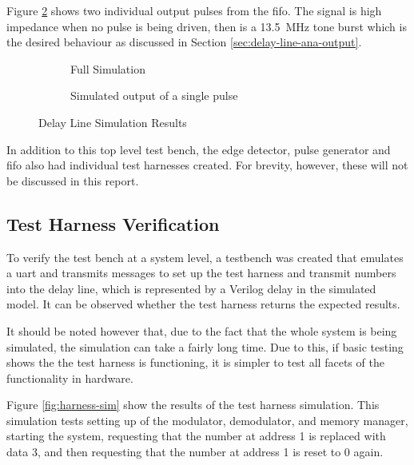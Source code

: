  Figure \ref{fig:delay-sim-single} shows two individual output pulses from the \gls{fifo}. The signal is high impedance when no pulse is being driven, then is a \SI{13.5}{\mega\hertz} tone burst which is the desired behaviour as discussed in Section \ref{sec:delay-line-ana-output}.
 
 \begin{figure}[ht]
 	\centering
 	
 	\begin{subfigure}[b]{\textwidth}
 		\centering
 		\caption{Full Simulation}
 		\label{fig:delay-sim-full}
 	\end{subfigure}
 	
 	\begin{subfigure}[b]{\textwidth}
 		\centering
 		\caption{Simulated output of a single pulse}
 		\label{fig:delay-sim-single}
 	\end{subfigure}
 	
 	\caption{Delay Line Simulation Results}
 	\label{fig:delay-sim}
 \end{figure}

In addition to this top level test bench, the edge detector, pulse generator and \gls{fifo} also had individual test harnesses created. For brevity, however, these will not be discussed in this report.

\subsection{Test Harness Verification}
To verify the test bench at a system level, a testbench was created that emulates a \gls{uart} and transmits messages to set up the test harness and transmit numbers into the delay line, which is represented by a Verilog delay in the simulated model. It can be observed whether the test harness returns the expected results.

It should be noted however that, due to the fact that the whole system is being simulated, the simulation can take a fairly long time. Due to this, if basic testing shows the the test harness is functioning, it is simpler to test all facets of the functionality in hardware.

Figure \ref{fig:harness-sim} show the results of the test harness simulation. This simulation tests setting up of the modulator, demodulator, and memory manager, starting the system, requesting that the number at address 1 is replaced with data 3, and then requesting that the number at address 1 is reset to 0 again.

